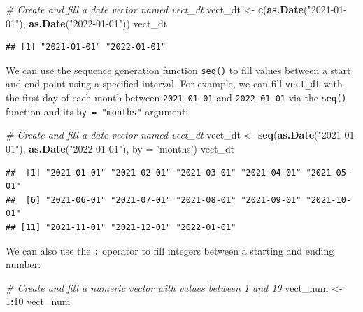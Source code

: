 \documentclass[]{book}
\newenvironment{Shaded}{\begin{snugshade}}{\end{snugshade}}
\newcommand{\CommentTok}[1]{\textcolor[rgb]{0.56,0.35,0.01}{\textit{#1}}}
\newcommand{\DataTypeTok}[1]{\textcolor[rgb]{0.13,0.29,0.53}{#1}}
\newcommand{\DecValTok}[1]{\textcolor[rgb]{0.00,0.00,0.81}{#1}}
\newcommand{\KeywordTok}[1]{\textcolor[rgb]{0.13,0.29,0.53}{\textbf{#1}}}
\newcommand{\NormalTok}[1]{#1}
\newcommand{\OperatorTok}[1]{\textcolor[rgb]{0.81,0.36,0.00}{\textbf{#1}}}
\newcommand{\StringTok}[1]{\textcolor[rgb]{0.31,0.60,0.02}{#1}}
\begin{document}
\begin{Shaded}
\begin{Highlighting}[]
\CommentTok{# Create and fill a date vector named vect_dt}
\NormalTok{vect_dt <-}\StringTok{ }\KeywordTok{c}\NormalTok{(}\KeywordTok{as.Date}\NormalTok{(}\StringTok{"2021-01-01"}\NormalTok{), }\KeywordTok{as.Date}\NormalTok{(}\StringTok{"2022-01-01"}\NormalTok{))}
\NormalTok{vect_dt}
\end{Highlighting}
\end{Shaded}

\begin{verbatim}
## [1] "2021-01-01" "2022-01-01"
\end{verbatim}

We can use the sequence generation function \texttt{seq()} to fill values between a start and end point using a specified interval. For example, we can fill \texttt{vect\_dt} with the first day of each month between \texttt{2021-01-01} and \texttt{2022-01-01} via the \texttt{seq()} function and its \texttt{by\ =\ "months"} argument:

\begin{Shaded}
\begin{Highlighting}[]
\CommentTok{# Create and fill a date vector named vect_dt}
\NormalTok{vect_dt <-}\StringTok{ }\KeywordTok{seq}\NormalTok{(}\KeywordTok{as.Date}\NormalTok{(}\StringTok{"2021-01-01"}\NormalTok{), }\KeywordTok{as.Date}\NormalTok{(}\StringTok{"2022-01-01"}\NormalTok{), }\DataTypeTok{by =} \StringTok{'months'}\NormalTok{)}
\NormalTok{vect_dt}
\end{Highlighting}
\end{Shaded}

\begin{verbatim}
##  [1] "2021-01-01" "2021-02-01" "2021-03-01" "2021-04-01" "2021-05-01"
##  [6] "2021-06-01" "2021-07-01" "2021-08-01" "2021-09-01" "2021-10-01"
## [11] "2021-11-01" "2021-12-01" "2022-01-01"
\end{verbatim}

We can also use the \texttt{:} operator to fill integers between a starting and ending number:

\begin{Shaded}
\begin{Highlighting}[]
\CommentTok{# Create and fill a numeric vector with values between 1 and 10}
\NormalTok{vect_num <-}\StringTok{ }\DecValTok{1}\OperatorTok{:}\DecValTok{10}
\NormalTok{vect_num}
\end{Highlighting}
\end{Shaded}
\end{document}
